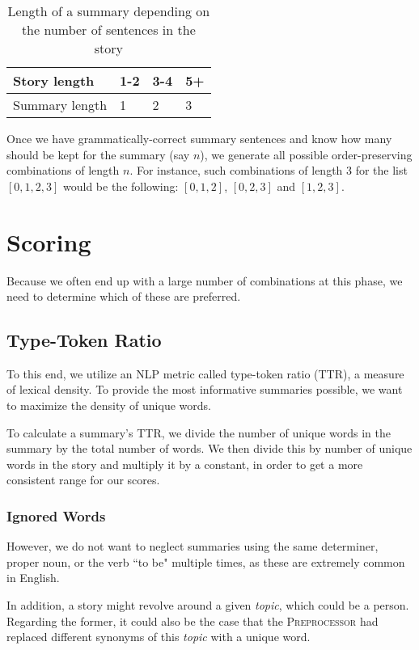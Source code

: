 \begin{table}[H]
\centering
\begin{tabular}{@{}llll@{}}
\toprule
Story length   & 1-2 & 3-4 & 5+ \\ \midrule
Summary length & 1   & 2   & 3  \\ \bottomrule
\end{tabular}
\caption{Length of a summary depending on the number of sentences in the story}
\label{tab:summary_length}
\end{table}

\noindent
Once we have grammatically-correct summary sentences and know how many should be kept for the summary (say $n$), we generate all possible order-preserving combinations of length $n$. For instance, such combinations of length 3 for the list $[0,1,2,3]$ would be the following: $[0,1,2]$, $[0,2,3]$ and $[1,2,3]$.

\section{Scoring}
\label{sec:scoring}

Because we often end up with a large number of combinations at this phase, we need to determine which of these are preferred.

\subsection{Type-Token Ratio}

To this end, we utilize an NLP metric called type-token ratio (TTR), a measure of lexical density. To provide the most informative summaries possible, we want to maximize the density of unique words.

To calculate a summary's TTR, we divide the number of unique words in the summary by the total number of words. We then divide this by number of unique words in the story and multiply it by a constant, in order to get a more consistent range for our scores.

\subsubsection*{Ignored Words}

However, we do not want to neglect summaries using the same determiner, proper noun, or the verb ``to be" multiple times, as these are extremely common in English.

In addition, a story might revolve around a given \textit{topic}, which could be a person. Regarding the former, it could also be the case that the \textsc{Preprocessor} had replaced different synonyms of this \textit{topic} with a unique word.

